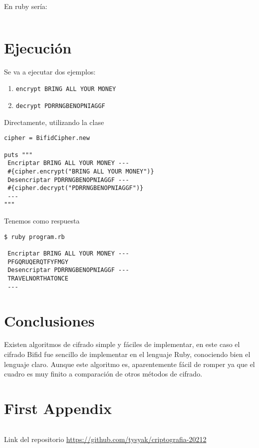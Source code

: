 \documentclass[onecolumn]{IEEEtran}
\begin{document}
En ruby sería:
\begin{code}
  \inputminted[firstline=39, lastline=54]{ruby}{../program.rb}
\end{code}

\newpage{}

\section{Ejecución}\label{sec:ejecucion}

Se va a ejecutar dos ejemplos:
\begin{enumerate}
  \item \texttt{encrypt BRING ALL YOUR MONEY}
  \item \texttt{decrypt PDRRNGBENOPNIAGGF}
\end{enumerate}

Directamente, utilizando la clase
\begin{code}[H]
  \begin{verbatim}
cipher = BifidCipher.new

puts """
 Encriptar BRING ALL YOUR MONEY ---
 #{cipher.encrypt("BRING ALL YOUR MONEY")}
 Desencriptar PDRRNGBENOPNIAGGF ---
 #{cipher.decrypt("PDRRNGBENOPNIAGGF")}
 ---
"""
  \end{verbatim}
\end{code}

Tenemos como respuesta
\begin{code}
  \begin{verbatim}
$ ruby program.rb

 Encriptar BRING ALL YOUR MONEY ---
 PFGQRUQERQTFYFMGY
 Desencriptar PDRRNGBENOPNIAGGF ---
 TRAVELNORTHATONCE
 ---
  \end{verbatim}
\end{code}


\section{Conclusiones}\label{sec:concluciones}
Existen algoritmos de cifrado simple y fáciles de implementar, en este caso
el cifrado Bifid fue sencillo de implementar en el lenguaje Ruby, conociendo
bien el lenguaje claro. Aunque este algoritmo es, aparentemente fácil de romper
ya que el cuadro es muy finito a comparación de otros métodos de cifrado.

\newpage{}




\listoflistings{}
\listofalgorithms{}
\listoftables{}

\nocite{*}
\printbibliography{}

\appendices
\section{First Appendix}\label{Codigo completo}
\begin{code}
  \inputminted[fontsize=\scriptsize]{ruby}{../program.rb}
  \caption{Link del repositorio
    \url{https://github.com/tysyak/criptografia-20212}}
\end{code}
\end{document}
